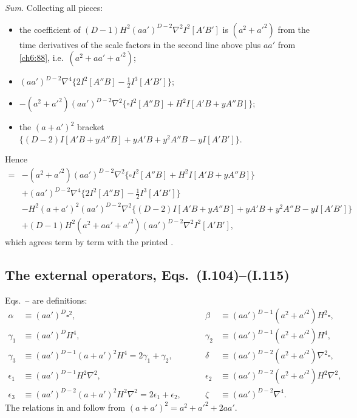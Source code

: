 \emph{Sum.} Collecting all pieces:
\begin{itemize}[leftmargin=14pt]
\item the coefficient of $(D-1)H^2(aa')^{D-2}\nabla^2I^2[A'B']$ is $(a^2+a'^2)$ from the time derivatives of the scale factors in the second line
above plus $aa'$ from \eqref{ch6:88}, i.e.\
$(a^2+aa'+a'^2)$;
\item $(aa')^{D-2}\nabla^4\{2I^2[A''B]-\frac12I^3[A'B']\}$;
\item $-(a^2+a'^2)(aa')^{D-2}\nabla^2\{\square I^2[A''B]+H^2I[A'B+yA''B]\}$;
\item the $(a+a')^2$ bracket $\{(D-2)I[A'B+yA''B]+yA'B+y^2A''B-yI[A'B']\}$.
\end{itemize}
Hence
\begin{equation}
\begin{split}
={}&-(a^2+a'^2)(aa')^{D-2}\nabla^2\big\{\square I^2[A''B]+H^2I[A'B+yA''B]\big\}\\
&+(aa')^{D-2}\nabla^4\big\{2I^2[A''B]-\tfrac12I^3[A'B']\big\}\\
&-H^2(a+a')^2(aa')^{D-2}\nabla^2\big\{(D-2)I[A'B+yA''B]+yA'B+y^2A''B-yI[A'B']\big\}\\
&+(D-1)H^2(a^2+aa'+a'^2)(aa')^{D-2}\nabla^2I^2[A'B'],
\end{split}\tag{I.103}
\end{equation}
which agrees term by term with the printed .

\subsection{The external operators, Eqs.~(I.104)--(I.115) \texorpdfstring{\tD\ \tA}{}}
\label{ch6:operators}

Eqs.~-- are definitions:
\begin{equation}
\begin{aligned}
\alpha&\equiv(aa')^D\square^2, & \beta&\equiv(aa')^{D-1}(a^2+a'^2)H^2\square,\\
\gamma_1&\equiv(aa')^DH^4, & \gamma_2&\equiv(aa')^{D-1}(a^2+a'^2)H^4,\\
\gamma_3&\equiv(aa')^{D-1}(a+a')^2H^4=2\gamma_1+\gamma_2, & \delta&\equiv(aa')^{D-2}(a^2+a'^2)\nabla^2\square,\\
\epsilon_1&\equiv(aa')^{D-1}H^2\nabla^2, & \epsilon_2&\equiv(aa')^{D-2}(a^2+a'^2)H^2\nabla^2,\\
\epsilon_3&\equiv(aa')^{D-2}(a+a')^2H^2\nabla^2=2\epsilon_1+\epsilon_2,\qquad & \zeta&\equiv(aa')^{D-2}\nabla^4 .
\end{aligned}
\end{equation}
The relations in  and  follow from $(a+a')^2=a^2+a'^2+2aa'$.

